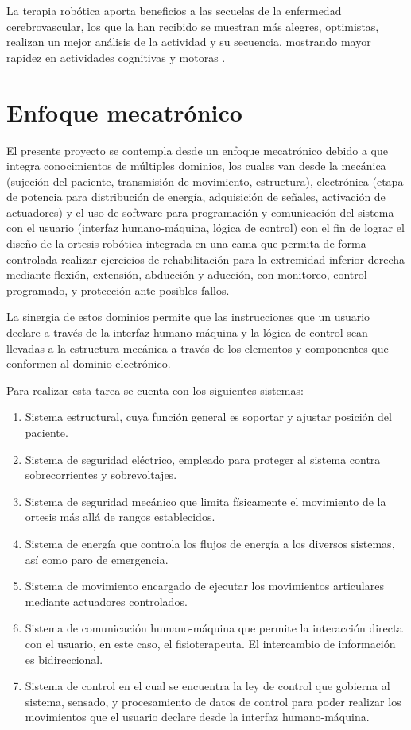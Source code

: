 La terapia robótica aporta beneficios a las secuelas de la enfermedad cerebrovascular, los que la han recibido se muestran más alegres, optimistas, realizan un mejor análisis de la actividad y su secuencia, mostrando mayor rapidez en actividades cognitivas y motoras \cite{03_02}.

\section{Enfoque mecatrónico}
El presente proyecto se contempla desde un enfoque mecatrónico debido a que integra conocimientos de múltiples dominios, los cuales van desde la mecánica (sujeción del paciente, transmisión de movimiento, estructura), electrónica (etapa de potencia para distribución de energía, adquisición de señales, activación de actuadores) y el uso de software para programación y comunicación del sistema con el usuario (interfaz humano-máquina, lógica de control) con el fin de lograr el diseño de la ortesis robótica integrada en una cama que permita de forma controlada realizar ejercicios de rehabilitación para la extremidad inferior derecha mediante flexión, extensión, abducción y aducción, con monitoreo, control programado, y protección ante posibles fallos.

La sinergia de estos dominios permite que las instrucciones que un usuario declare a través de la interfaz humano-máquina y la lógica de control sean llevadas a la estructura mecánica a través de los elementos y componentes que conformen al dominio electrónico.

Para realizar esta tarea se cuenta con los siguientes sistemas:

\begin{enumerate}
	\item Sistema estructural, cuya función general es soportar y ajustar posición del paciente.
	\item Sistema de seguridad eléctrico, empleado para proteger al sistema contra sobrecorrientes y sobrevoltajes.
	\item	Sistema de seguridad mecánico que limita físicamente el movimiento de la ortesis más allá de rangos establecidos.
	\item	Sistema de energía que controla los flujos de energía a los diversos sistemas, así como paro de emergencia.
	\item Sistema de movimiento encargado de ejecutar los movimientos articulares mediante actuadores controlados.
	\item Sistema de comunicación humano-máquina que permite la interacción directa con el usuario, en este caso, el fisioterapeuta. El intercambio de información es bidireccional. 
	\item Sistema de control en el cual se encuentra la ley de control que gobierna al sistema, sensado, y procesamiento de datos de control para poder realizar los movimientos que el usuario declare desde la interfaz humano-máquina.
\end{enumerate}

